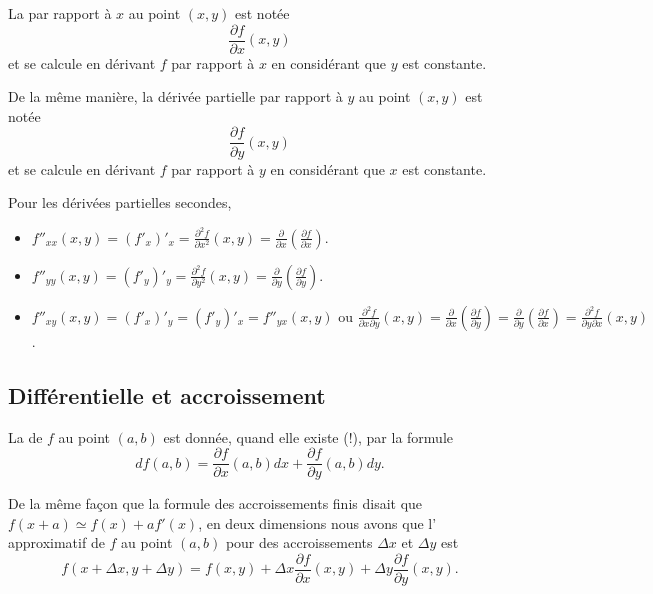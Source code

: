 La  par rapport à \( x\) au point \( (x,y)\) est notée
\begin{equation}
	\frac{\partial f}{\partial x}(x,y)
\end{equation}
et se calcule en dérivant \( f\) par rapport  à \( x\) en considérant que \( y\) est constante.

De la même manière, la dérivée partielle par rapport à \( y\) au point \( (x,y)\) est notée
\begin{equation}
	\frac{\partial f}{\partial y}(x,y)
\end{equation}
et se calcule en dérivant \( f\) par rapport  à \( y\) en considérant que \( x\) est constante.

Pour les dérivées partielles secondes,
\begin{itemize}
	\item \( f''_{xx} (x,y) = (f'_x)'_x = \frac{\partial^2 f}{\partial x^2}(x,y) = \frac{\partial}{\partial x}(\frac{\partial f}{\partial x})\).
	\item \( f''_{yy} (x,y) = (f'_y)'_y = \frac{\partial^2 f}{\partial y^2}(x,y) = \frac{\partial}{\partial y}(\frac{\partial f}{\partial y})\).
	\item \( f''_{xy} (x,y) = (f'_x)'_y  = (f'_y)'_x = f''_{yx} (x,y) \text{ ou } \frac{\partial^2 f}{\partial x \partial y}(x,y) = \frac{\partial}{\partial x}(\frac{\partial f}{\partial y})  = \frac{\partial}{\partial y}(\frac{\partial f}{\partial x}) =\frac{\partial^2 f}{\partial y \partial x}(x,y)\).
\end{itemize}

\subsection{Différentielle et accroissement}

La  de \( f\) au point \( (a,b)\) est donnée, quand elle existe (!), par la formule
\begin{equation}
	df(a,b) = \frac{\partial f}{\partial x}(a,b)dx + \frac{\partial f}{\partial y}(a,b) dy.
\end{equation}

De la même façon que la formule des accroissements finis disait que \( f(x+a)\simeq f(x)+af'(x)\), en deux dimensions nous avons que l' approximatif de \( f\) au point \( (a,b)\) pour des accroissements \( \Delta x\) et \( \Delta y\) est
\begin{equation}
	f(x+\Delta x,y+\Delta y)=f(x,y)+\Delta x\frac{ \partial f }{ \partial x }(x,y)+\Delta y\frac{ \partial f }{ \partial y }(x,y).
\end{equation}

